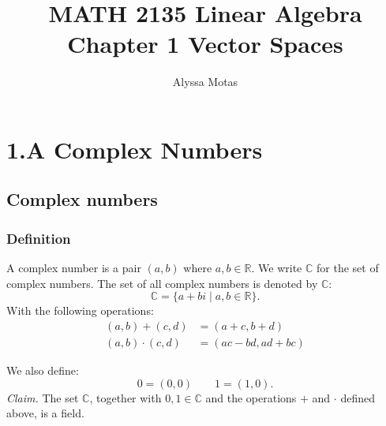 \documentclass[11pt]{article}
\title{\textbf{MATH 2135 Linear Algebra} \\ Chapter 1 Vector Spaces}
\author{Alyssa Motas}
\begin{document}
    \maketitle

    \pagebreak

    \tableofcontents

    \pagebreak

    \section{1.A Complex Numbers}

    \subsection{Complex numbers}

    \subsubsection{Definition}
    A complex number is a pair \((a,b)\) where \(a,b \in \mathbb{R}\). We write \(\mathbb{C}\) for the set of complex numbers. The set of all complex numbers is denoted by \(\mathbb{C}\): \[\mathbb{C} = \{a + bi \mid a,b \in \mathbb{R}\}.\]With the following operations:
    \begin{align*}
        (a,b) + (c,d)     &= (a+c, b+d)    \\
        (a,b) \cdot (c,d) &= (ac-bd,ad+bc) 
    \end{align*}

    We also define: \[0 = (0,0) \qquad 1 = (1,0).\]
    \emph{Claim.} The set \(\mathbb{C}\), together with \(0,1 \in \mathbb{C}\) and the operations \(+\) and \(\cdot\) defined above, is a field.
\end{document}
